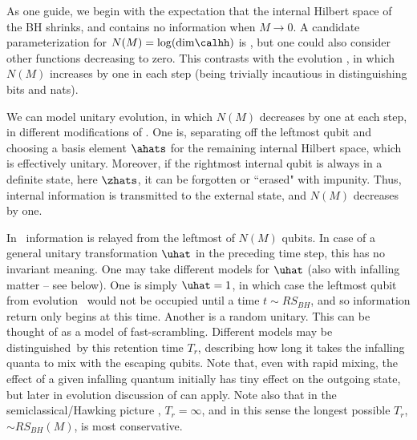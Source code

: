 As one guide, we begin with the expectation that the internal Hilbert space of the BH shrinks, and contains no information when $M\rightarrow0$. A candidate parameterization for $N(M) = \log({\rm dim} \calhh)$ is  \ndof, but one could also consider other functions decreasing to zero.  This contrasts with the evolution \paircreate, in which $N(M)$ increases by one in each step (being trivially incautious in distinguishing bits and nats).

We can model unitary evolution, in which $N(M)$ decreases by one at each step, in different modifications of \paircreate. One is, separating off the leftmost qubit and choosing a basis element $\ahats$ for the remaining internal Hilbert space,
%
\eqn{}
%
which is effectively unitary. Moreover, if the rightmost internal qubit is always in a definite state, here $\zhats$, it can be forgotten or ``erased" with impunity.  Thus, internal information is transmitted to the external state, and $N(M)$ decreases by one.   

In \evolone\ information is relayed from the leftmost of $N(M)$ qubits.  In case of a general unitary transformation $\uhat$ in the preceding time step, this has no invariant meaning.  One may take different models for $\uhat$ (also with infalling matter -- see below).  One is simply $\uhat=1$, in which case the leftmost qubit from evolution \paircreate\ would not be occupied until a time $t\sim R S_{BH}$, and so information return only begins at this time.  Another is a random unitary.  This can be thought of as a model of fast-scrambling.  Different models may be distinguished\NLvC\ by this retention time $T_r$, describing how long it takes the infalling quanta to mix with the escaping qubits.  Note that, even with rapid mixing, the effect of a given infalling quantum initially has tiny effect on the outgoing state, but later in evolution discussion of  can apply.
Note also that in the semiclassical/Hawking picture \paircreate, $T_r=\infty$, and in this sense the longest possible $T_r$, $\sim R S_{BH}(M)$, is most conservative.

